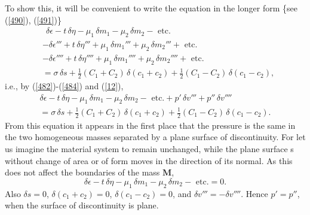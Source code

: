 \documentclass[12pt]{article}
\newcommand{\dd}{\delta}
\begin{document}
{To show this, it will be convenient to write the equation in the
longer form \{see (\ref{490}), (\ref{491})\}
\begin{align}
&\ \  \dd \epsilon - t \, \dd \eta- \mu_1 \, \dd m_1 - \mu_2 \, \dd m_2 - \text{ etc.} \nonumber \\
&- \dd \epsilon''' + t \, \dd \eta'''+ \mu_1 \, \dd m_1''' + \mu_2 \, \dd m_2''' + \text{ etc.} \nonumber \\
&- \dd \epsilon'''' + t \, \dd \eta''''+ \mu_1 \, \dd m_1'''' + \mu_2 \, \dd m_2''''+ \text{ etc.} \nonumber \\
&= \sigma \, \dd s + \tfrac{1}{2}(C_1 + C_2)\, \dd (c_1 + c_2)+ \tfrac{1}{2}(C_1 - C_2) \,\dd(c_1 - c_2),  \label{495} \end{align}
i.e., by (\ref{482})-(\ref{484}) and (\ref{12}),
\begin{multline}
\dd \epsilon - t \, \dd \eta- \mu_1 \, \dd m_1 - \mu_2 \, \dd m_2 - \text{ etc.} +p' \, \dd v''' +p''\, \dd v'''' \\
=  \sigma \, \dd s + \tfrac{1}{2}(C_1 + C_2)\, \dd (c_1 + c_2)+ \tfrac{1}{2}(C_1 - C_2) \,\dd(c_1 - c_2).  \label{496} \end{multline}
From this equation it appears in the first place that the pressure is the same in the two homogeneous masses separated by a plane surface of discontinuity. For let us imagine the material system to remain unchanged, while the plane surface s without change of area or of form moves in the direction of its normal. As this does not affect the boundaries of the mass $\mathbf{M}$,
$$\dd \epsilon - t \, \dd \eta- \mu_1 \, \dd m_1 - \mu_2 \, \dd m_2 - \text{ etc.} =0.$$
Also $\delta s = 0$, $\delta (c_1 + c_2) = 0$, $\delta (c_1 - c_2) = 0$, and $\delta v''' = - \delta v''''$. Hence $p' =p''$, when the surface of discontinuity is plane.


}
\end{document}
